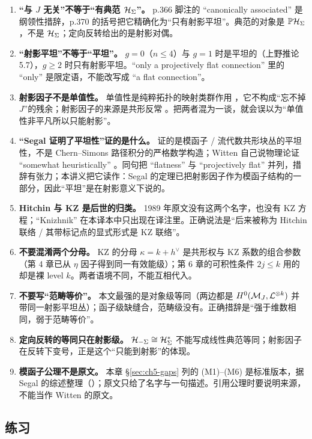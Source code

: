 \begin{enumerate}[leftmargin=1.7em,itemsep=3pt]
\item \textbf{“与 $J$ 无关”不等于“有典范 $\mathcal{H}_\Sigma$”。} p.366 脚注的 “canonically associated” 是纲领性措辞，p.370 的括号把它精确化为“只有射影平坦”。典范的对象是 $\mathbb P\mathcal{H}_\Sigma$，不是 $\mathcal{H}_\Sigma$；定向反转给出的是射影对偶。
\item \textbf{“射影平坦”不等于“平坦”。} $g=0$（$n\le4$）与 $g=1$ 时是平坦的（上野推论 5.7），$g\ge2$ 时只有射影平坦。“only a projectively flat connection” 里的 “only” 是限定语，不能改写成 “a flat connection”。
\item \textbf{射影因子不是单值性。} 单值性是纯粹拓扑的映射类群作用 ，它不构成“忘不掉 $J$”的残余；射影因子的来源是共形反常 。把两者混为一谈，就会误以为“单值性非平凡所以只能射影”。
\item \textbf{“Segal 证明了平坦性”证的是什么。} 证的是模函子 / 流代数共形块丛的平坦性，不是 Chern--Simons 路径积分的严格数学构造；Witten 自己说物理论证 “somewhat heuristically” 。同句把 “flatness” 与 “projectively flat” 并列，措辞有张力；本讲义把它读作：Segal 的定理已把射影因子作为模函子结构的一部分，因此“平坦”是在射影意义下说的。
\item \textbf{Hitchin 与 KZ 是后世的归类。} 1989 年原文没有这两个名字，也没有 KZ 方程；“Knizhnik” 在本译本中只出现在译注里。正确说法是“后来被称为 Hitchin 联络 / 其带标记点的显式形式是 KZ 联络”。
\item \textbf{不要混淆两个分母。} KZ 的分母 $\kappa=k+h^\vee$ 是共形权与 KZ 系数的组合参数（第 4 章已从 $\eta$ 因子得到同一有效能级）；第 6 章的可积性条件 $2j\le k$ 用的却是裸 level $k$。两者语境不同，不能互相代入。
\item \textbf{不要写“范畴等价”。} 本文最强的是对象级等同（两边都是 $H^0(\mathcal{M}_J,\mathcal{L}^{\otimes k})$ 并带同一射影平坦丛）；函子级缺缝合，范畴级没有。正确措辞是“强于维数相同，弱于范畴等价”。
\item \textbf{定向反转的等同只在射影级。} $\mathcal{H}_{-\Sigma}\cong\mathcal{H}_\Sigma^{*}$ 不能写成线性典范等同；射影因子在反转下变号，正是这个“只能到射影”的体现。
\item \textbf{模函子公理不是原文。} 本章 \S\ref{sec:ch5-gaps} 列的 (M1)--(M6) 是标准版本，据 Segal 的综述整理（\ours）；原文只给了名字与一句描述。引用公理时要说明来源，不能当作 Witten 的原文。
\end{enumerate}

\subsection{练习}
\label{sec:ch5-exercises}

